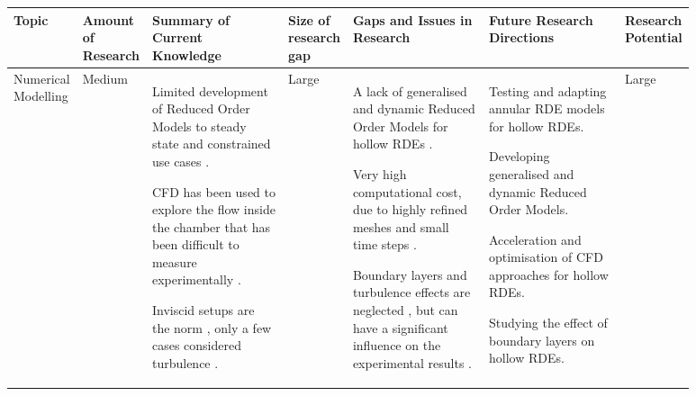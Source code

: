 \documentclass{article}
\begin{document}
\begin{landscape}
\begin{table}[ht]
	\centering
	\begin{tabular}{p{0.1\linewidth} | p{0.06\linewidth} | p{0.2\linewidth} | p{0.06\linewidth} | p{0.2\linewidth} | p{0.2\linewidth} | p{0.06\linewidth}}
		\toprule
		Topic     & Amount of Research    & Summary of Current Knowledge & Size of research gap & Gaps and Issues in Research & Future Research Directions & Research Potential\\
        \midrule
        Numerical Modelling  & \cellcolor[HTML]{FFE5D9}  Medium &  
        Limited development of Reduced Order Models to steady state and constrained use cases \cite{Nakata2022,Yokoo2020,Goto2020,Goto2022}.
        \par
        CFD has been used to explore the flow inside the chamber that has been difficult to measure experimentally \cite{Sun2019,Sada2022}.
        \par
        Inviscid setups are the norm \cite{Sun2019,Sada2022}, only a few cases considered turbulence \cite{Sun2019,Stoddard2016}.
        \par
        & \cellcolor[HTML]{D8E2DC}  Large &
        A lack of generalised and dynamic Reduced Order Models for hollow RDEs \cite{Nakata2022,Yokoo2020,Goto2020,Goto2022}.
        \par
        Very high computational cost, due to highly refined meshes and small time steps \cite{Schwer2021}.
        \par
        Boundary layers and turbulence effects are neglected \cite{Sada2022}, but can have a significant influence on the experimental results \cite{Nakata2022,Ishihara2023}.
        \par
        & 
        Testing and adapting annular RDE models \cite{Koch2020,Koch2021} for hollow RDEs.
        \par
        Developing generalised and dynamic Reduced Order Models.
        \par
        Acceleration and optimisation of CFD approaches for hollow RDEs.
        \par
        Studying the effect of boundary layers on hollow RDEs.
        \par
        & \cellcolor[HTML]{D8E2DC} Large\\
		\bottomrule
	\end{tabular}
	\label{table2c}
\end{table}

\end{landscape}
\end{document}
